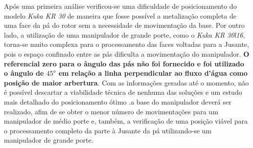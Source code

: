 Após uma primeira análise verificou-se uma dificuldade de posicionamento do
modelo \textit{Kuka KR 30} de maneira que fosse possível a metalização completa
de uma face da pá do rotor sem a necessidade de movimentação da base. Por outro
lado, a utilização de uma manipulador de grande porte, como o \textit{Kuka KR
30l16}, torna-se muito complexa para o processamento das faces voltadas para a
Jusante, pois o espaço confinado entre as pás dificulta a movimentação do
manipulador. \textbf{O referencial zero para o ângulo das pás não foi
fornecido e foi utilizado o ângulo de $45^o$ em relação a linha perpendicular ao
fluxo d'água como posição de maior arbertura}. Com as informações geradas até o
momento, não é possível descartar a viabilidade técnica de nenhuma das soluções
e um estudo mais detalhado do posicionamento ótimo .a base do manipulador deverá
ser realizado, afim de se obter o menor número de movimentações para um
manipulador de médio porte e, também, a verificação de uma posição viável para o
processamento completo da parte à Jusante da pá utilizando-se um manipulador de
grande porte.
